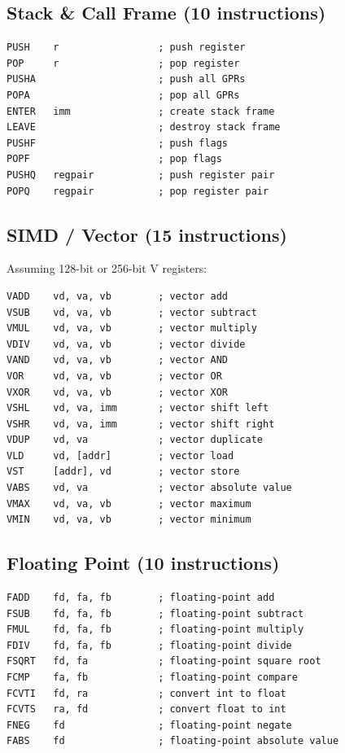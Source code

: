 \documentclass[12pt]{article}
\begin{document}
\subsection{Stack \& Call Frame (10 instructions)}

\begin{lstlisting}
PUSH    r                 ; push register
POP     r                 ; pop register
PUSHA                     ; push all GPRs
POPA                      ; pop all GPRs
ENTER   imm               ; create stack frame
LEAVE                     ; destroy stack frame
PUSHF                     ; push flags
POPF                      ; pop flags
PUSHQ   regpair           ; push register pair
POPQ    regpair           ; pop register pair
\end{lstlisting}

\subsection{SIMD / Vector (15 instructions)}

Assuming 128-bit or 256-bit V registers:

\begin{lstlisting}
VADD    vd, va, vb        ; vector add
VSUB    vd, va, vb        ; vector subtract
VMUL    vd, va, vb        ; vector multiply
VDIV    vd, va, vb        ; vector divide
VAND    vd, va, vb        ; vector AND
VOR     vd, va, vb        ; vector OR
VXOR    vd, va, vb        ; vector XOR
VSHL    vd, va, imm       ; vector shift left
VSHR    vd, va, imm       ; vector shift right
VDUP    vd, va            ; vector duplicate
VLD     vd, [addr]        ; vector load
VST     [addr], vd        ; vector store
VABS    vd, va            ; vector absolute value
VMAX    vd, va, vb        ; vector maximum
VMIN    vd, va, vb        ; vector minimum
\end{lstlisting}

\subsection{Floating Point (10 instructions)}

\begin{lstlisting}
FADD    fd, fa, fb        ; floating-point add
FSUB    fd, fa, fb        ; floating-point subtract
FMUL    fd, fa, fb        ; floating-point multiply
FDIV    fd, fa, fb        ; floating-point divide
FSQRT   fd, fa            ; floating-point square root
FCMP    fa, fb            ; floating-point compare
FCVTI   fd, ra            ; convert int to float
FCVTS   ra, fd            ; convert float to int
FNEG    fd                ; floating-point negate
FABS    fd                ; floating-point absolute value
\end{lstlisting}
\end{document}

